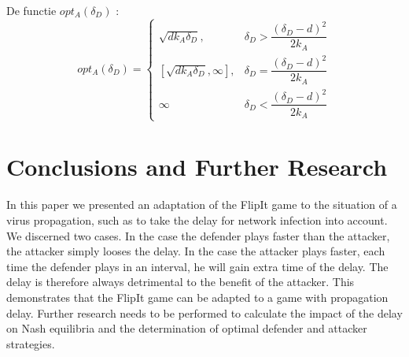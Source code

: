 \documentclass[master=cws, masteroption=vs,english]{kulemt}
\begin{document}
\begin{abstract*}
De functie $opt_{A}(\delta_{D})$ :
 \begin{displaymath}
  opt_{A}(\delta_{D}) = \left\{
     \begin{array}{lr}
       \sqrt{d k_{A}\delta_{D}}, & \delta_{D} > \dfrac{(\delta_{D}-d)^{2}}{2k_{A}}\\
       \left[ \sqrt{d k_{A}\delta_{D}}, \infty\right],  & \delta_{D} = \dfrac{(\delta_{D}-d)^{2}}{2k_{A}} \\
       \infty & \delta_{D} < \dfrac{(\delta_{D}-d)^{2}}{2k_{A}}
     \end{array}
   \right.
\end{displaymath} 
\section{Conclusions and Further Research}
\label{ch:conclusion}
In this paper we presented an adaptation of the FlipIt game to the situation of a virus propagation, such as to take the delay for network infection into account. We discerned two cases. In the case the defender plays faster than the attacker, the attacker simply looses the delay. In the case the attacker plays faster, each time the defender plays in an interval, he will gain extra time of the delay. The delay is therefore always detrimental to the benefit of the attacker. 
This demonstrates that the FlipIt game can be adapted to a game with propagation delay. Further research needs to be performed to calculate the impact of the delay on Nash equilibria and the determination of optimal defender and attacker strategies.
%  
\end{abstract*}
\end{document}
